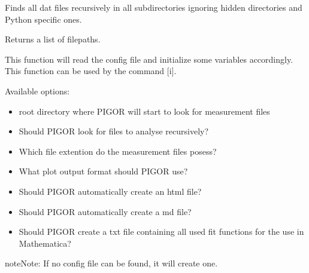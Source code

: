 \documentclass[letterpaper,10pt,english]{sphinxmanual}
\begin{document}

\begin{fulllineitems}
\label{\detokenize{pigor:pigor.find_all_files}}
Finds all dat files recursively in all subdirectories ignoring hidden directories
and Python specific ones.

Returns a list of filepaths.

\end{fulllineitems}


\begin{fulllineitems}
\label{\detokenize{pigor:pigor.init}}
This function will read the config file and initialize some variables
accordingly. This function can be used by the command {[}i{]}.

Available options:
\begin{itemize}
\item {} 
root directory where PIGOR will start to look for measurement files

\item {} 
Should PIGOR look for files to analyse recursively?

\item {} 
Which file extention do the measurement files posess?

\item {} 
What plot output format should PIGOR use?

\item {} 
Should PIGOR automatically create an html file?

\item {} 
Should PIGOR automatically create a md file?

\item {} 
Should PIGOR create a txt file containing all used fit functions for the use in Mathematica?

\end{itemize}

\begin{sphinxadmonition}{note}{Note:}
If no config file can be found, it will create one.
\end{sphinxadmonition}

\end{fulllineitems}
\end{document}
